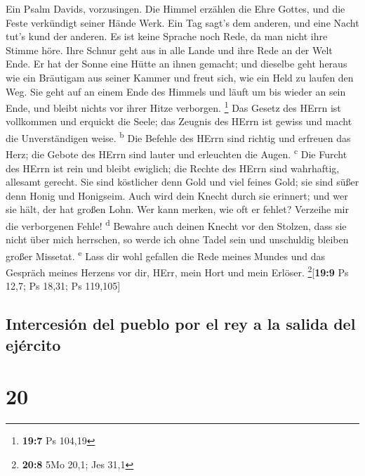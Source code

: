  Ein Psalm Davids, vorzusingen.  Die Himmel
erzählen die Ehre Gottes, und die Feste verkündigt seiner Hände Werk.
 Ein Tag sagt's dem anderen, und eine Nacht tut's kund der
anderen.  Es ist keine Sprache noch Rede, da man nicht
ihre Stimme höre.  Ihre Schnur geht aus in alle Lande und
ihre Rede an der Welt Ende. Er hat der Sonne eine Hütte an ihnen
gemacht;  und dieselbe geht heraus wie ein Bräutigam aus
seiner Kammer und freut sich, wie ein Held zu laufen den Weg.
 Sie geht auf an einem Ende des Himmels und läuft um bis
wieder an sein Ende, und bleibt nichts vor ihrer Hitze verborgen.
\footnote{\textbf{19:7} Ps 104,19}  Das Gesetz des HErrn
ist vollkommen und erquickt die Seele; das Zeugnis des HErrn ist gewiss
und macht die Unverständigen weise. \textsuperscript{b} 
Die Befehle des HErrn sind richtig und erfreuen das Herz; die Gebote des
HErrn sind lauter und erleuchten die Augen. \textsuperscript{c}
 Die Furcht des HErrn ist rein und bleibt ewiglich; die
Rechte des HErrn sind wahrhaftig, allesamt gerecht.  Sie
sind köstlicher denn Gold und viel feines Gold; sie sind süßer denn
Honig und Honigseim.  Auch wird dein Knecht durch sie
erinnert; und wer sie hält, der hat großen Lohn.  Wer
kann merken, wie oft er fehlet? Verzeihe mir die verborgenen Fehle!
\textsuperscript{d}  Bewahre auch deinen Knecht vor den
Stolzen, dass sie nicht über mich herrschen, so werde ich ohne Tadel
sein und unschuldig bleiben großer Missetat. \textsuperscript{e}
 Lass dir wohl gefallen die Rede meines Mundes und das
Gespräch meines Herzens vor dir, HErr, mein Hort und mein Erlöser.
\footnote{\textbf{20:8} 5Mo 20,1; Jes 31,1}{[}\textbf{19:9} Ps 12,7; Ps
18,31; Ps 119,105{]}

\hypertarget{intercesiuxf3n-del-pueblo-por-el-rey-a-la-salida-del-ejuxe9rcito}{%
\subsection{Intercesión del pueblo por el rey a la salida del
ejército}\label{intercesiuxf3n-del-pueblo-por-el-rey-a-la-salida-del-ejuxe9rcito}}

\hypertarget{section-19}{%
\section{20}\label{section-19}}

